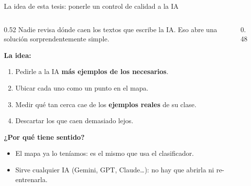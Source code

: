 \begin{frame}{La idea de esta tesis: ponerle un control de calidad a la IA}
\begin{columns}[T]

\begin{column}{0.52\textwidth}
\small
Nadie revisa dónde caen los textos que escribe la IA. Eso abre una solución sorprendentemente simple.

\vspace{0.2em}
\textbf{La idea:}
\begin{enumerate}\setlength\itemsep{1pt}\footnotesize
  \item Pedirle a la IA \textbf{más ejemplos de los necesarios}.
  \item Ubicar cada uno como un punto en el mapa.
  \item Medir qué tan cerca cae de los \textbf{ejemplos reales} de su clase.
  \item \alert{Descartar los que caen demasiado lejos}.
\end{enumerate}

\vspace{0.3em}
\textbf{¿Por qué tiene sentido?}
\begin{itemize}\setlength\itemsep{1pt}\footnotesize
  \item El mapa \alert{ya lo teníamos}: es el mismo que usa el clasificador.
  \item Sirve cualquier IA (Gemini, GPT, Claude\dots): no hay que abrirla ni re-entrenarla.
\end{itemize}
\end{column}

\begin{column}{0.48\textwidth}
\centering
\vspace{0.2em}
\end{column}
\end{columns}
\end{frame}
